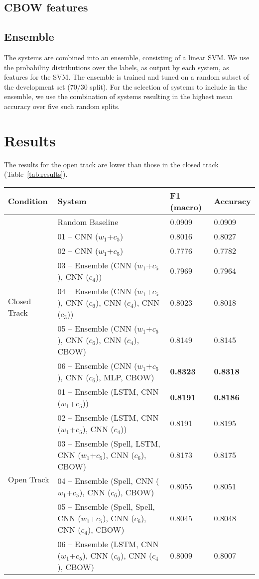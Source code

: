 \documentclass[11pt,letterpaper]{article}
\begin{document}
\subsection{CBOW features}

\subsection{Ensemble}
The systems are combined into an ensemble, consisting of a linear SVM.
We use the probability distributions over the labels, as output by each system, as features for the SVM.
The ensemble is trained and tuned on a random subset of the development set ($70/30$ split).
For the selection of systems to include in the ensemble, we use the combination of systems resulting in the highest mean accuracy over five such random splits.

\section{Results}
The results for the open track are lower than those in the closed track (Table~\ref{tab:results}).

\begin{table*}[h]
    \small
\center
\caption{Results for the essay task, in the closed and open tracks.}
\label{tab:results}
\begin{tabular}{llll}
\toprule
\bf Condition & \bf System & \bf F1 (macro) & \bf Accuracy \\
\midrule
& Random Baseline & 0.0909 & 0.0909 \\
\midrule
\multirow{6}{*}{Closed Track} & 01 -- CNN ($w_1$+$c_5$) & 0.8016 & 0.8027 \\
& 02 -- CNN ($w_1$+$c_5$) & 0.7776 & 0.7782 \\
& 03 -- Ensemble (CNN ($w_1$+$c_5$), CNN ($c_4$)) & 0.7969 & 0.7964 \\
& 04 -- Ensemble (CNN ($w_1$+$c_5$), CNN ($c_6$), CNN ($c_4$), CNN ($c_3$)) & 0.8023 & 0.8018 \\
& 05 -- Ensemble (CNN ($w_1$+$c_5$), CNN ($c_6$), CNN ($c_4$), CBOW) & 0.8149 & 0.8145 \\
& 06 -- Ensemble (CNN ($w_1$+$c_5$), CNN ($c_6$), MLP, CBOW) & \bf 0.8323 & \bf 0.8318 \\
\midrule
\multirow{6}{*}{Open Track} & 01 -- Ensemble (LSTM, CNN ($w_1$+$c_5$)) & \bf 0.8191 & \bf 0.8186 \\
& 02 -- Ensemble (LSTM, CNN ($w_1$+$c_5$), CNN ($c_4$)) & 0.8191   &  0.8195 \\
& 03 -- Ensemble (Spell, LSTM, CNN ($w_1$+$c_5$), CNN ($c_6$), CBOW) & 0.8173   &  0.8175 \\
& 04 -- Ensemble (Spell, CNN ($w_1$+$c_5$), CNN ($c_6$), CBOW) & 0.8055   &  0.8051 \\
& 05 -- Ensemble (Spell, Spell, CNN ($w_1$+$c_5$), CNN ($c_6$), CNN ($c_4$), CBOW) & 0.8045   &  0.8048 \\
& 06 -- Ensemble (LSTM, CNN ($w_1$+$c_5$), CNN ($c_6$), CNN ($c_4$), CBOW)& 0.8009   &  0.8007 \\
\bottomrule
\end{tabular}
\end{table*}
\end{document}

